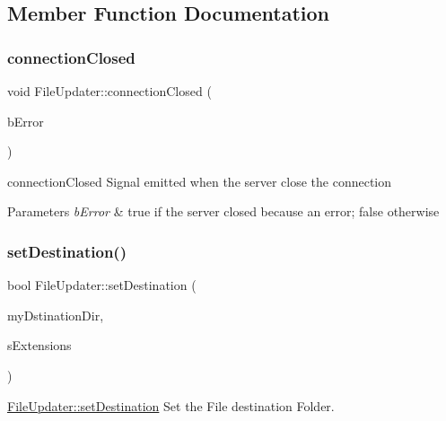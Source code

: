 \subsection{Member Function Documentation}
\mbox{\label{classFileUpdater_af460a6c15c3d606b7206650112477a28}} 
\subsubsection{\texorpdfstring{connection\+Closed}{connectionClosed}}
{\footnotesize\ttfamily void File\+Updater\+::connection\+Closed (\begin{DoxyParamCaption}\item[{bool}]{b\+Error }\end{DoxyParamCaption})\hspace{0.3cm}{\ttfamily [signal]}}



connection\+Closed Signal emitted when the server close the connection 


\begin{DoxyParams}{Parameters}
{\em b\+Error} & true if the server closed because an error; false otherwise \\
\hline
\end{DoxyParams}
\mbox{\label{classFileUpdater_aad3c90fbc960c8aa84b964f3ae1d8f11}} 
\subsubsection{\texorpdfstring{set\+Destination()}{setDestination()}}
{\footnotesize\ttfamily bool File\+Updater\+::set\+Destination (\begin{DoxyParamCaption}\item[{Q\+String}]{my\+Dstination\+Dir,  }\item[{Q\+String}]{s\+Extensions }\end{DoxyParamCaption})}



\mbox{\hyperlink{classFileUpdater_aad3c90fbc960c8aa84b964f3ae1d8f11}{File\+Updater\+::set\+Destination}} Set the File destination Folder. 


